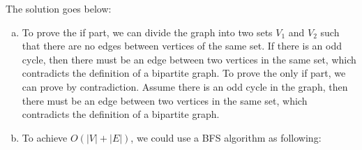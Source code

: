 \documentclass[10pt]{article}
\begin{document}
\begin{solution}
    The solution goes below:
    \begin{enumerate}[(a)]
        \item  To prove the if part, we can divide the graph into two sets $V_1$ and $V_2$ such that there are no edges between vertices of the same set. If there is an odd cycle, then there must be an edge between two vertices in the same set, which contradicts the definition of a bipartite graph. To prove the only if part, we can prove by contradiction. Assume there is an odd cycle in the graph, then there must be an edge between two vertices in the same set, which contradicts the definition of a bipartite graph.
        \item To achieve $O(|V|+|E|)$, we could use a BFS algorithm as following: 



\end{enumerate}
\end{solution}
\end{document}
